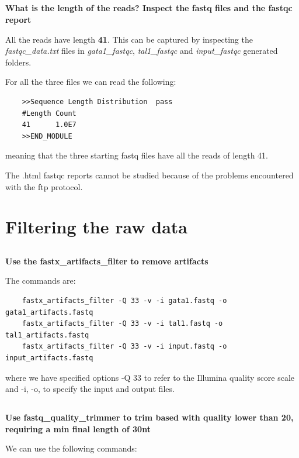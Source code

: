\documentclass[12pt, a4paper]{article}
\begin{document}
	\subsection{}
	\textbf{What is the length of the reads? Inspect the fastq files and the fastqc report}
	
	All the reads have length \textbf{41}. This can be captured by inspecting the \textit{fastqc\_data.txt} files in \textit{gata1\_fastqc}, \textit{tal1\_fastqc} and \textit{input\_fastqc} generated folders.
	
	For all the three files we can read the following:
	
	\begin{verbatim}
	>>Sequence Length Distribution  pass
	#Length Count
	41      1.0E7
	>>END_MODULE
	\end{verbatim}
	meaning that the three starting fastq files have all the reads of length 41.
	
	The .html fastqc reports cannot be studied because of the problems encountered with the ftp protocol.
	
	\section{Filtering the raw data}
	
	\subsection{}
	\textbf{Use the fastx\_artifacts\_filter to remove artifacts}
	
	The commands are:
	
	\begin{verbatim}
	fastx_artifacts_filter -Q 33 -v -i gata1.fastq -o gata1_artifacts.fastq
	fastx_artifacts_filter -Q 33 -v -i tal1.fastq -o tal1_artifacts.fastq
	fastx_artifacts_filter -Q 33 -v -i input.fastq -o input_artifacts.fastq
	\end{verbatim}
	
	where we have specified options -Q 33 to refer to the Illumina quality score scale and -i, -o, to specify the input and output files.
	
	\subsection{}
	\textbf{Use fastq\_quality\_trimmer to trim based with quality lower than 20, requiring a min final length of 30nt}
	
	We can use the following commands:
	
\end{document}

